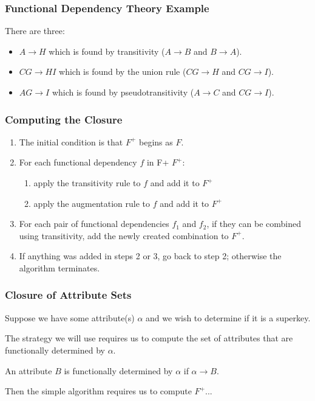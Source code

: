 \begin{frame}
\frametitle{Functional Dependency Theory Example}

There are three:
\begin{itemize}
	\item $A \rightarrow H$ which is found by transitivity ($A \rightarrow B$ and $B \rightarrow A$).
	\item $CG \rightarrow HI$ which is found by the union rule ($CG \rightarrow H$ and $CG \rightarrow I$).
	\item $AG \rightarrow I$ which is found by pseudotransitivity ($A \rightarrow C$ and $CG \rightarrow I$). 
\end{itemize}


\end{frame}



\begin{frame}
\frametitle{Computing the Closure}

\begin{enumerate}
	\item The initial condition is that $F^{+}$ begins as $F$.
	\item For each functional dependency $f$ in F+ $F^{+}$:
	\begin{enumerate}
		\item apply the transitivity rule to $f$ and add it to $F^{+}$
		\item apply the augmentation rule to $f$ and add it to $F^{+}$
	\end{enumerate}
	\item For each pair of functional dependencies $f_{1}$ and $f_{2}$, if they can be combined using transitivity, add the newly created combination to $F^{+}$.
	\item If anything was added in steps 2 or 3, go back to step 2; otherwise the algorithm terminates.
\end{enumerate}

\end{frame}



\begin{frame}
\frametitle{Closure of Attribute Sets}

Suppose we have some attribute(s) $\alpha$ and we wish to determine if it is a superkey. 

The strategy we will use requires us to compute the set of attributes that are \alert{functionally determined} by $\alpha$. 

An attribute $B$ is functionally determined by $\alpha$ if $\alpha \rightarrow B$. 

Then the simple algorithm requires us to compute $F^{+}$...

\end{frame}



